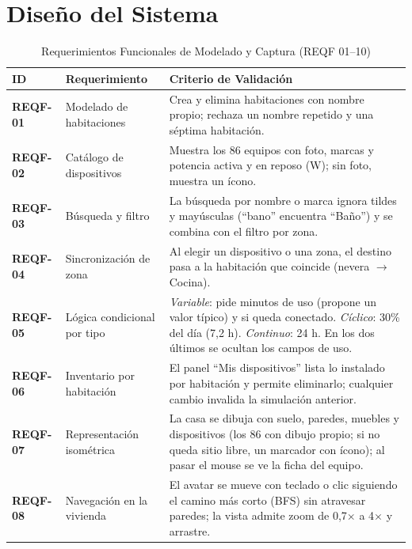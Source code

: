 \documentclass[10pt,journal,compsoc]{IEEEtran}
\begin{document}
\section{Diseño del Sistema}
\begin{table}[p]
\centering
\footnotesize
\renewcommand{\arraystretch}{0.97}
\caption{Requerimientos Funcionales de Modelado y Captura (REQF 01--10)}
\label{tab:reqf1}
\begin{tabularx}{\textwidth}{@{}l l X@{}}
\toprule
\textbf{ID} & \textbf{Requerimiento} & \textbf{Criterio de Validación} \\
\midrule
\textbf{REQF-01} & Modelado de habitaciones & Crea y elimina habitaciones con nombre propio; rechaza un nombre repetido y una séptima habitación. \\
\textbf{REQF-02} & Catálogo de dispositivos & Muestra los 86 equipos con foto, marcas y potencia activa y en reposo (W); sin foto, muestra un ícono. \\
\textbf{REQF-03} & Búsqueda y filtro & La búsqueda por nombre o marca ignora tildes y mayúsculas (``bano'' encuentra ``Baño'') y se combina con el filtro por zona. \\
\textbf{REQF-04} & Sincronización de zona & Al elegir un dispositivo o una zona, el destino pasa a la habitación que coincide (nevera $\rightarrow$ Cocina). \\
\textbf{REQF-05} & Lógica condicional por tipo & \emph{Variable}: pide minutos de uso (propone un valor típico) y si queda conectado. \emph{Cíclico}: 30\% del día (7,2 h). \emph{Continuo}: 24 h. En los dos últimos se ocultan los campos de uso. \\
\textbf{REQF-06} & Inventario por habitación & El panel ``Mis dispositivos'' lista lo instalado por habitación y permite eliminarlo; cualquier cambio invalida la simulación anterior. \\
\textbf{REQF-07} & Representación isométrica & La casa se dibuja con suelo, paredes, muebles y dispositivos (los 86 con dibujo propio; si no queda sitio libre, un marcador con ícono); al pasar el mouse se ve la ficha del equipo. \\
\textbf{REQF-08} & Navegación en la vivienda & El avatar se mueve con teclado o clic siguiendo el camino más corto (BFS) sin atravesar paredes; la vista admite zoom de 0,7$\times$ a 4$\times$ y arrastre. \\

\end{tabularx}
\end{table}
\end{document}
